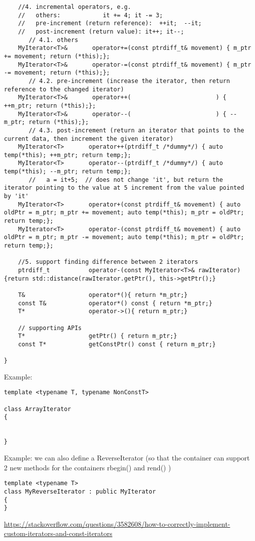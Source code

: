 \begin{lstlisting}
    //4. incremental operators, e.g. 
    //   others: 			it += 4; it -= 3;
    //   pre-increment (return reference):  ++it;  --it;
    //   post-increment (return value): it++; it--; 
       // 4.1. others
    MyIterator<T>&       operator+=(const ptrdiff_t& movement) { m_ptr += movement; return (*this);};
    MyIterator<T>&       operator-=(const ptrdiff_t& movement) { m_ptr -= movement; return (*this);};
       // 4.2. pre-increment (increase the iterator, then return reference to the changed iterator)
    MyIterator<T>&       operator++(						) { ++m_ptr; return (*this);};
    MyIterator<T>&       operator--(						) { --m_ptr; return (*this);};
       // 4.3. post-increment (return an iterator that points to the current data, then increment the given iterator)
    MyIterator<T>       operator++(ptrdiff_t /*dummy*/) { auto temp(*this); ++m_ptr; return temp;};
    MyIterator<T>       operator--(ptrdiff_t /*dummy*/) { auto temp(*this); --m_ptr; return temp;};
       //   a = it+5;  // does not change 'it', but return the iterator pointing to the value at 5 increment from the value pointed by 'it'
    MyIterator<T>       operator+(const ptrdiff_t& movement) { auto oldPtr = m_ptr; m_ptr += movement; auto temp(*this); m_ptr = oldPtr; return temp;};
    MyIterator<T>       operator-(const ptrdiff_t& movement) { auto oldPtr = m_ptr; m_ptr -= movement; auto temp(*this); m_ptr = oldPtr; return temp;};
    
    //5. support finding difference between 2 iterators
    ptrdiff_t           operator-(const MyIterator<T>& rawIterator){return std::distance(rawIterator.getPtr(), this->getPtr();}
    
    T&                  operator*(){ return *m_ptr;}
    const T&            operator*() const { return *m_ptr;}
    T*                  operator->(){ return m_ptr;}
    
    // supporting APIs
    T*                  getPtr() { return m_ptr;}
    const T*            getConstPtr() const { return m_ptr;}

}
\end{lstlisting}

Example: 
\begin{lstlisting}
template <typename T, typename NonConstT>

class ArrayIterator 
{


}
\end{lstlisting}


Example:  we can also define a ReverseIterator (so that the container can
support 2 new methods for the containers rbegin() and rend() )
\begin{lstlisting}
template <typename T>
class MyReverseIterator : public MyIterator
{
}
\end{lstlisting}
\url{https://stackoverflow.com/questions/3582608/how-to-correctly-implement-custom-iterators-and-const-iterators}